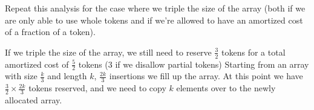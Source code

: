 
Repeat this analysis for the case where we triple the size of the
array (both if we are only able to use whole tokens and if we're
allowed to have an amortized cost of a fraction of a token).

\answerline{}

\answerline{}

\answerline{}

\begin{solution}
  If we triple the size of the array, we still need to reserve
  $\frac{3}{2}$ tokens for a total amortized cost of $\frac{5}{2}$
  tokens (3 if we disallow partial tokens) Starting from an array with
  size $\frac{k}{3}$ and length $k$, $\frac{2k}{3}$ insertions we fill
  up the array. At this point we have $\frac{3}{2} \times
  \frac{2k}{3}$ tokens reserved, and we need to copy $k$ elements over
  to the newly allocated array.
\end{solution}